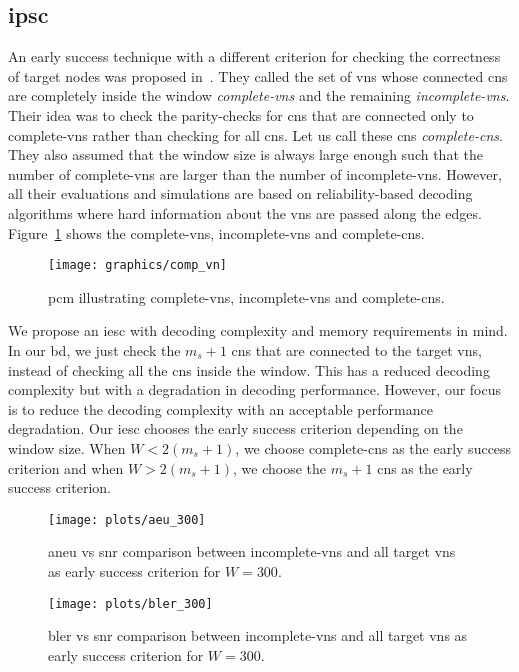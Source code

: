 \subsection{\acl{ipsc}}
An early success technique with a different criterion for checking the correctness of target nodes was proposed in~\cite{Kang2018}. They called the set of \acp{vn} whose connected \acp{cn} are completely inside the window \emph{complete-\acp{vn}} and the remaining \emph{incomplete-\acp{vn}}. Their idea was to check the parity-checks for \acp{cn} that are connected only to complete-\acp{vn} rather than checking for all \acp{cn}. Let us call these \acp{cn} \emph{complete-\acp{cn}}. They also assumed that the window size is always large enough such that the number of complete-\acp{vn} are larger than the number of incomplete-\acp{vn}. However, all their evaluations and simulations are based on reliability-based decoding algorithms where hard information about the \acp{vn} are passed along the edges. Figure~\ref{fig:comp_vn} shows the complete-\acp{vn}, incomplete-\acp{vn} and complete-\acp{cn}.
\begin{figure}[htbp]
  \centering
  \texttt{[image: graphics/comp\_vn]}
  \caption{\ac{pcm} illustrating complete-\acp{vn}, incomplete-\acp{vn} and complete-\acp{cn}.}
  \label{fig:comp_vn}
\end{figure}

We propose an \ac{iesc} with decoding complexity and memory requirements in mind. In our \ac{bd}, we just check the $m_s+1$ \acp{cn} that are connected to the target \acp{vn}, instead of checking all the \acp{cn} inside the window. This has a reduced decoding complexity but with a degradation in decoding performance. However, our focus is to reduce the decoding complexity with an acceptable performance degradation. Our \ac{iesc} chooses the early success criterion depending on the window size. When $W<2(m_s+1)$, we choose complete-\acp{cn} as the early success criterion and when $W>2(m_s+1)$, we choose the $m_s+1$ \acp{cn} as the early success criterion.

\begin{figure}[htbp]
  \centering
  \texttt{[image: plots/aeu\_300]}
  \caption{\ac{aneu} vs \ac{snr} comparison between incomplete-\acp{vn} and all target \acp{vn} as early success criterion for $W=300$.}
  \label{fig:aneu_vs_snr_300}
\end{figure}

\begin{figure}[htbp]
  \centering
  \texttt{[image: plots/bler\_300]}
  \caption{\ac{bler} vs \ac{snr} comparison between incomplete-\acp{vn} and all target \acp{vn} as early success criterion for $W=300$.}
  \label{fig:bler_vs_snr_300}
\end{figure}

